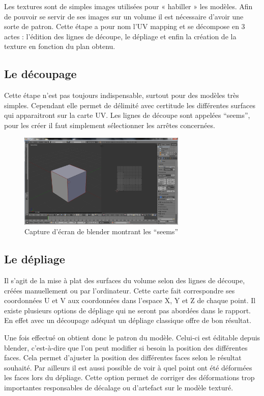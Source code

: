 \documentclass[11pt]{report}
\begin{document}
Les textures sont de simples images utilisées pour « habiller » les modèles. Afin de pouvoir se servir de ses images sur un volume il est nécessaire d’avoir une sorte de patron. Cette étape a pour nom l’UV mapping et se décompose en 3 actes : l’édition des lignes de découpe, le dépliage et enfin la création de la texture en fonction du plan obtenu.

\subsection{Le découpage}

Cette étape n’est pas toujours indispensable, surtout pour des modèles très simples. Cependant elle permet de délimité avec certitude les différentes surfaces qui apparaitront sur la carte UV. Les lignes de découpe sont appelées ``seems'', pour les créer il faut simplement sélectionner les arrêtes  concernées. 

\begin{figure}[htbp]
\centering
\includegraphics[width=8cm]{seems.png}
\caption{Capture d'écran de blender montrant les ``seems''}
\end{figure}

\subsection{Le dépliage}

Il s’agit de la mise à plat des surfaces du volume selon des lignes de découpe, créées manuellement ou par l’ordinateur. Cette carte fait correspondre ses coordonnées U et V aux coordonnées dans l’espace X, Y et Z de chaque point. Il existe plusieurs options de dépliage qui ne seront pas abordées dans le rapport. En effet avec un découpage adéquat un dépliage classique offre de bon résultat. 

Une fois effectué on obtient donc le patron du modèle. Celui-ci est éditable depuis blender, c’est-à-dire que l’on peut modifier si besoin la position des différentes faces. Cela permet d’ajuster la position des différentes faces selon le résultat souhaité. Par ailleurs il est aussi possible de voir à quel point ont été déformées les faces lors du dépliage. Cette option permet de corriger des déformations trop importantes responsables de décalage ou d’artefact sur le modèle texturé.
\end{document}
